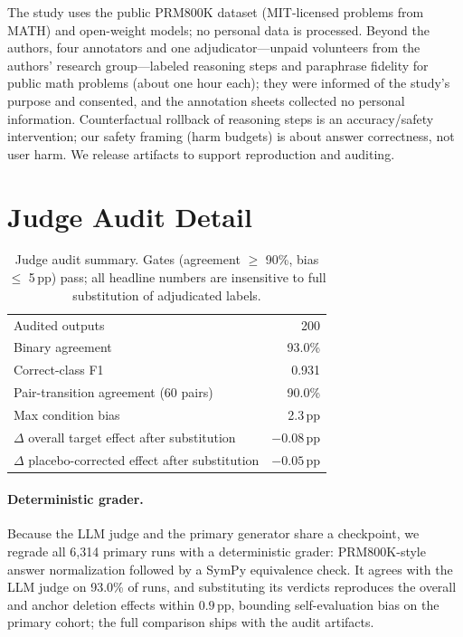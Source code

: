 \documentclass[11pt]{article}
\begin{document}
The study uses the public PRM800K dataset (MIT-licensed problems from MATH) and open-weight models; no personal data is processed. Beyond the authors, four annotators and one adjudicator---unpaid volunteers from the authors' research group---labeled reasoning steps and paraphrase fidelity for public math problems (about one hour each); they were informed of the study's purpose and consented, and the annotation sheets collected no personal information. Counterfactual rollback of reasoning steps is an accuracy/safety intervention; our safety framing (harm budgets) is about answer correctness, not user harm. We release artifacts to support reproduction and auditing.



\appendix

\section{Judge Audit Detail}
\label{app:judge}

\begin{table}[h]
\centering
\small
\begin{tabular}{@{}lr@{}}
\toprule
Audited outputs & 200 \\
Binary agreement & 93.0\% \\
Correct-class F1 & 0.931 \\
Pair-transition agreement (60 pairs) & 90.0\% \\
Max condition bias & 2.3\,pp \\
$\Delta$ overall target effect after substitution & $-0.08$\,pp \\
$\Delta$ placebo-corrected effect after substitution & $-0.05$\,pp \\
\bottomrule
\end{tabular}
\caption{Judge audit summary. Gates (agreement $\ge$ 90\%, bias $\le$ 5\,pp) pass; all headline numbers are insensitive to full substitution of adjudicated labels.}
\label{tab:judge}
\end{table}

\paragraph{Deterministic grader.} Because the LLM judge and the primary generator share a checkpoint, we regrade all 6{,}314 primary runs with a deterministic grader: PRM800K-style answer normalization followed by a SymPy equivalence check. It agrees with the LLM judge on 93.0\% of runs, and substituting its verdicts reproduces the overall and anchor deletion effects within $0.9$\,pp, bounding self-evaluation bias on the primary cohort; the full comparison ships with the audit artifacts.
\end{document}
